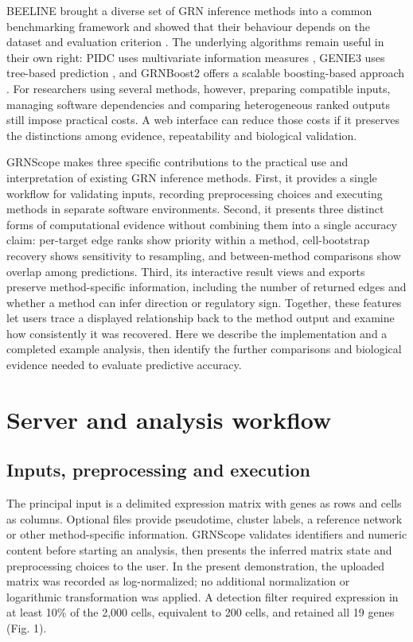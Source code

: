 \documentclass[11pt]{article}
\begin{document}
BEELINE brought a diverse set of GRN inference methods into a common benchmarking framework and showed that their behaviour depends on the dataset and evaluation criterion \cite{pratapa2020}. The underlying algorithms remain useful in their own right: PIDC uses multivariate information measures \cite{chan2017}, GENIE3 uses tree-based prediction \cite{huynhthu2010}, and GRNBoost2 offers a scalable boosting-based approach \cite{moerman2019}. For researchers using several methods, however, preparing compatible inputs, managing software dependencies and comparing heterogeneous ranked outputs still impose practical costs. A web interface can reduce those costs if it preserves the distinctions among evidence, repeatability and biological validation.

GRNScope makes three specific contributions to the practical use and interpretation of existing GRN inference methods. First, it provides a single workflow for validating inputs, recording preprocessing choices and executing methods in separate software environments. Second, it presents three distinct forms of computational evidence without combining them into a single accuracy claim: per-target edge ranks show priority within a method, cell-bootstrap recovery shows sensitivity to resampling, and between-method comparisons show overlap among predictions. Third, its interactive result views and exports preserve method-specific information, including the number of returned edges and whether a method can infer direction or regulatory sign. Together, these features let users trace a displayed relationship back to the method output and examine how consistently it was recovered. Here we describe the implementation and a completed example analysis, then identify the further comparisons and biological evidence needed to evaluate predictive accuracy.

\section{Server and analysis workflow}

\subsection{Inputs, preprocessing and execution}

The principal input is a delimited expression matrix with genes as rows and cells as columns. Optional files provide pseudotime, cluster labels, a reference network or other method-specific information. GRNScope validates identifiers and numeric content before starting an analysis, then presents the inferred matrix state and preprocessing choices to the user. In the present demonstration, the uploaded matrix was recorded as log-normalized; no additional normalization or logarithmic transformation was applied. A detection filter required expression in at least 10\% of the 2,000 cells, equivalent to 200 cells, and retained all 19 genes (Fig. 1).
\end{document}
